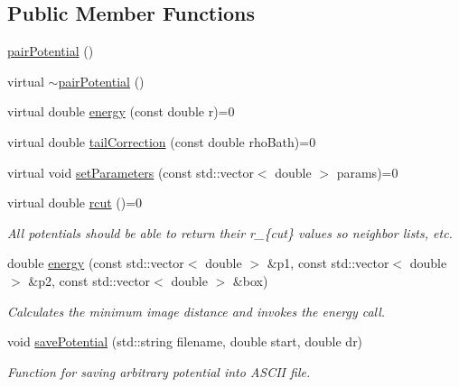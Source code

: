 \subsection*{Public Member Functions}
\begin{DoxyCompactItemize}
\item 
\hyperlink{classpair_potential_a97a5ee64f179cbc0636dc2364fe7f7f4}{pair\+Potential} ()
\item 
virtual \hyperlink{classpair_potential_a8b68006b0fa57cb78c31e6dd2a8dde86}{$\sim$pair\+Potential} ()
\item 
virtual double \hyperlink{classpair_potential_a43dc9c840e25dc76e76d6ad7947c165d}{energy} (const double r)=0
\item 
virtual double \hyperlink{classpair_potential_a5387d21d8d487d1d42e9eaf7cae9175b}{tail\+Correction} (const double rho\+Bath)=0
\item 
virtual void \hyperlink{classpair_potential_ad4b237646f9de2ae9f95cc9350564bc5}{set\+Parameters} (const std\+::vector$<$ double $>$ params)=0
\item 
virtual double \hyperlink{classpair_potential_abf4f8d231c5e2e36d72916d33dcd75f0}{rcut} ()=0
\begin{DoxyCompactList}\small\item\em All potentials should be able to return their r\+\_\+\{cut\} values so neighbor lists, etc. \end{DoxyCompactList}\item 
double \hyperlink{classpair_potential_a1163a4943615f1c3e82b0630aedcba18}{energy} (const std\+::vector$<$ double $>$ \&p1, const std\+::vector$<$ double $>$ \&p2, const std\+::vector$<$ double $>$ \&box)
\begin{DoxyCompactList}\small\item\em Calculates the minimum image distance and invokes the energy call. \end{DoxyCompactList}\item 
void \hyperlink{classpair_potential_a2d57e0c3678ef3624cc1edc2a4f5d121}{save\+Potential} (std\+::string filename, double start, double dr)
\begin{DoxyCompactList}\small\item\em Function for saving arbitrary potential into A\+S\+C\+I\+I file. \end{DoxyCompactList}\end{DoxyCompactItemize}
